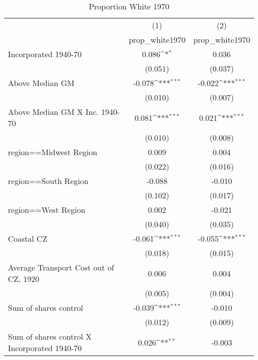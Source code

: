 \begin{table}[htbp]\centering
\def\sym#1{\ifmmode^{#1}\else\(^{#1}\)\fi}
\caption{Proportion White 1970}
\begin{tabular}{l*{2}{c}}
\hline\hline
                    &\multicolumn{1}{c}{(1)}&\multicolumn{1}{c}{(2)}\\
                    &\multicolumn{1}{c}{prop\_white1970}&\multicolumn{1}{c}{prop\_white1970}\\
\hline
Incorporated 1940-70&       0.086\sym{*}  &       0.036         \\
                    &     (0.051)         &     (0.037)         \\
[1em]
Above Median GM     &      -0.078\sym{***}&      -0.022\sym{***}\\
                    &     (0.010)         &     (0.007)         \\
[1em]
Above Median GM X Inc. 1940-70&       0.081\sym{***}&       0.021\sym{***}\\
                    &     (0.010)         &     (0.008)         \\
[1em]
region==Midwest Region&       0.009         &       0.004         \\
                    &     (0.022)         &     (0.016)         \\
[1em]
region==South Region&      -0.088         &      -0.010         \\
                    &     (0.102)         &     (0.017)         \\
[1em]
region==West Region &       0.002         &      -0.021         \\
                    &     (0.040)         &     (0.035)         \\
[1em]
Coastal CZ          &      -0.061\sym{***}&      -0.055\sym{***}\\
                    &     (0.018)         &     (0.015)         \\
[1em]
Average Transport Cost out of CZ, 1920&       0.006         &       0.004         \\
                    &     (0.005)         &     (0.004)         \\
[1em]
Sum of shares control&      -0.039\sym{***}&      -0.010         \\
                    &     (0.012)         &     (0.009)         \\
[1em]
Sum of shares control X Incorporated 1940-70&       0.026\sym{**} &      -0.003         \\

\end{tabular}
\end{table}
